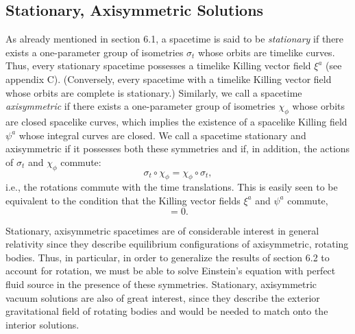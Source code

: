 
\subsection{Stationary, Axisymmetric Solutions}\label{sec:7.1}

As already mentioned in section 6.1, a spacetime is said to be \emph{stationary} if
there exists a one-parameter group of isometries \(\sigma_t\) whose orbits are
timelike curves. Thus, every stationary spacetime possesses a timelike Killing vector
field \(\xi^a\) (see appendix C). (Conversely, every spacetime with a timelike
Killing vector field whose orbits are complete is stationary.) Similarly, we call a
spacetime \emph{axisymmetric} if there exists a one-parameter group of isometries
\(\chi_\phi\) whose orbits are closed spacelike curves, which implies the existence
of a spacelike Killing field \(\psi^a\) whose integral curves are closed. We call a
spacetime stationary and axisymmetric if it possesses both these symmetries and if,
in addition, the actions of \(\sigma_t\) and \(\chi_\phi\) commute:
\begin{equation}
  \sigma_t\circ\chi_\phi=\chi_\phi\circ\sigma_t ,
  \tag{7.1.1}\label{eq:7.1.1}
\end{equation}
i.e., the rotations commute with the time translations. This is easily seen to be
equivalent to the condition that the Killing vector fields \(\xi^a\) and \(\psi^a\)
commute,
\begin{equation}
  [\xi,\psi]=0 .
  \tag{7.1.2}\label{eq:7.1.2}
\end{equation}

Stationary, axisymmetric spacetimes are of considerable interest in general
relativity since they describe equilibrium configurations of axisymmetric, rotating
bodies. Thus, in particular, in order to generalize the results of section 6.2 to
account for rotation, we must be able to solve Einstein's equation with perfect fluid
source in the presence of these symmetries. Stationary, axisymmetric vacuum
solutions are also of great interest, since they describe the exterior gravitational
field of rotating bodies and would be needed to match onto the interior solutions.

